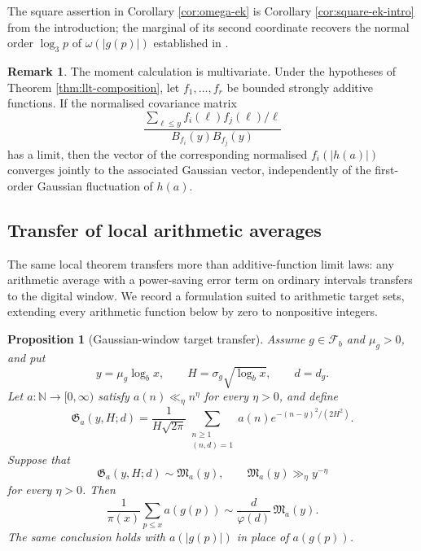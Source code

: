 \documentclass[11pt,reqno]{amsart}
\theoremstyle{plain}
\newtheorem{proposition}[theorem]{Proposition}
\theoremstyle{definition}
\newtheorem{remark}[theorem]{Remark}
\newcommand{\N}{\mathbb{N}}
\newcommand{\1}{\mathbf 1}
\begin{document}
The square assertion in Corollary \ref{cor:omega-ek} is Corollary \ref{cor:square-ek-intro} from the introduction; the marginal of its second coordinate recovers the normal order $\log_3p$ of $\omega(|g(p)|)$ established in \cite{vibefrtz}.

\begin{remark}\label{rem:multivariate-ek}
The moment calculation is multivariate.  Under the hypotheses of Theorem \ref{thm:llt-composition}, let $f_1,\ldots,f_r$ be bounded strongly additive functions.  If the normalised covariance matrix
\[
 \frac{\sum_{\ell\le y}f_i(\ell)f_j(\ell)/\ell}
 {B_{f_i}(y)B_{f_j}(y)}
\]
has a limit, then the vector of the corresponding normalised $f_i(|h(a)|)$ converges jointly to the associated Gaussian vector, independently of the first-order Gaussian fluctuation of $h(a)$.
\end{remark}

\subsection{Transfer of local arithmetic averages}\label{sec:targets}

The same local theorem transfers more than additive-function limit laws: any arithmetic average with a power-saving error term on ordinary intervals transfers to the digital window.  We record a formulation suited to arithmetic target sets, extending every arithmetic function below by zero to nonpositive integers.

\begin{proposition}[Gaussian-window target transfer]\label{prop:target-transfer}
Assume $g\in\mathcal F_b$ and $\mu_g>0$, and put
\[
 y=\mu_g\log_bx,\qquad H=\sigma_g\sqrt{\log_bx},\qquad d=d_g.
\]
Let $a:\N\to[0,\infty)$ satisfy $a(n)\ll_\eta n^\eta$ for every $\eta>0$, and define
\begin{equation}\label{eq:gaussian-target-mean}
 \mathfrak G_a(y,H;d)=
 \frac1{H\sqrt{2\pi}}
 \sum_{\substack{n\ge1\\(n,d)=1}}
 a(n)e^{-(n-y)^2/(2H^2)}.
\end{equation}
Suppose that
\[
 \mathfrak G_a(y,H;d)\sim\mathfrak M_a(y),
 \qquad
 \mathfrak M_a(y)\gg_\eta y^{-\eta}
\]
for every $\eta>0$.  Then
\begin{equation}\label{eq:target-transfer}
 \frac1{\pi(x)}\sum_{p\le x}a(g(p))
 \sim \frac d{\varphi(d)}\,\mathfrak M_a(y).
\end{equation}
The same conclusion holds with $a(|g(p)|)$ in place of $a(g(p))$.
\end{proposition}
\end{document}
